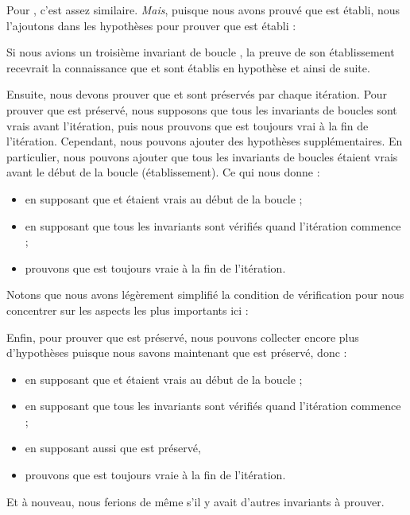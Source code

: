 

Pour , c'est assez similaire. \textit{Mais}, puisque nous avons
prouvé que  est établi, nous l'ajoutons dans les hypothèses pour
prouver que  est établi :




Si nous avions un troisième invariant de boucle , la preuve de
son établissement recevrait la connaissance que  et 
sont établis en hypothèse et ainsi de suite.


Ensuite, nous devons prouver que  et  sont
préservés par chaque itération. Pour prouver que  est préservé,
nous supposons que tous les invariants de boucles sont vrais avant l'itération,
puis nous prouvons que  est toujours vrai à la fin de l'itération.
Cependant, nous pouvons ajouter des hypothèses supplémentaires. En particulier,
nous pouvons ajouter que tous les invariants de boucles étaient vrais avant le
début de la boucle (établissement). Ce qui nous donne :
\begin{itemize}
  \item en supposant que  et  étaient vrais au
        début de la boucle ;
  \item en supposant que tous les invariants sont vérifiés quand l'itération
        commence ;
  \item prouvons que  est toujours vraie à la fin de l'itération.
\end{itemize}
Notons que nous avons légèrement simplifié la condition de vérification pour
nous concentrer sur les aspects les plus importants ici :




Enfin, pour prouver que  est préservé, nous pouvons
collecter encore plus d'hypothèses puisque nous savons maintenant que
 est préservé, donc :
\begin{itemize}
  \item en supposant que  et  étaient vrais au
        début de la boucle ;
  \item en supposant que tous les invariants sont vérifiés quand l'itération
        commence ;
  \item en supposant aussi que  est préservé,
  \item prouvons que  est toujours vraie à la fin de l'itération.
\end{itemize}
Et à nouveau, nous ferions de même s'il y avait d'autres invariants à prouver.


